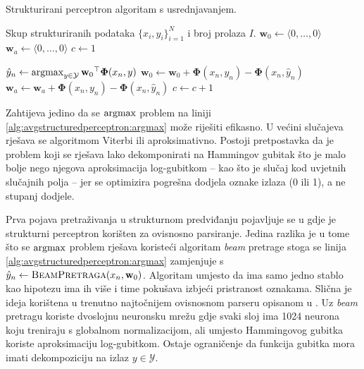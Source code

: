 \begin{algorithm}
\caption{Strukturirani perceptron algoritam s usrednjavanjem.}
\label{alg:avgstructuredperceptron}
\begin{algorithmic}[1]
\Require Skup strukturiranih podataka $\{x_i, y_i\}_{i=1}^N$ i broj prolaza $I$.
\State $\mathbf{w}_0 \gets \langle 0, \ldots, 0 \rangle$
\State $\mathbf{w}_a \gets \langle 0, \ldots, 0 \rangle$
\State $c \gets 1$

    \State $\hat{y}_n \gets \operatorname*{argmax}_{y \in \mathcal{Y}} {\mathbf{w}_0}^\top \mathbf{\Phi}(x_n, y)$ \label{alg:avgstructuredperceptron:argmax}
    \label{alg:structuredperceptron:condition}
    \State $\mathbf{w}_0 \gets \mathbf{w}_0 + \mathbf{\Phi}(x_n, y_n) - \mathbf{\Phi}(x_n, \hat{y}_n)$
    \State $\mathbf{w}_a \gets \mathbf{w}_a + \mathbf{\Phi}(x_n, y_n) - \mathbf{\Phi}(x_n, \hat{y}_n)$
    \EndIf
    \State $c \gets c + 1$
  \EndFor

\EndFor

\State {}
\end{algorithmic}
\end{algorithm}

Zahtijeva jedino da se $\operatorname*{argmax}$ problem na liniji
\ref{alg:avgstructuredperceptron:argmax} može riješiti efikasno. U većini
slučajeva rješava se algoritmom Viterbi ili aproksimativno. Postoji pretpostavka
da je problem koji se rješava lako dekomponirati na Hammingov gubitak što je
malo bolje nego njegova aproksimacija log-gubitkom -- kao što je slučaj kod
uvjetnih slučajnih polja -- jer se optimizira pogrešna dodjela oznake izlaza (0
ili 1), a ne stupanj dodjele.

Prva pojava pretraživanja u strukturnom predviđanju pojavljuje se u
\citep{collins2004incremental} gdje je strukturni perceptron korišten za
ovisnosno parsiranje. Jedina razlika je u tome što se $\operatorname*{argmax}$ problem rješava
koristeći algoritam \textit{beam} pretrage stoga se linija
\ref{alg:avgstructuredperceptron:argmax} zamjenjuje s $\hat{y}_n \gets
\textsc{BeamPretraga}(x_n, \mathbf{w}_0)$. Algoritam umjesto da ima samo jedno
stablo kao hipotezu ima ih više i time pokušava izbjeći pristranost oznakama.
Slična je ideja korištena u trenutno najtočnijem ovisnosnom parseru opisanom u
\citep{andor2016globally}. Uz \textit{beam} pretragu koriste dvoslojnu neuronsku
mrežu gdje svaki sloj ima 1024 neurona koju treniraju s globalnom
normalizacijom, ali umjesto Hammingovog gubitka koriste aproksimaciju
log-gubitkom. Ostaje ograničenje da funkcija gubitka mora imati dekompoziciju na
izlaz $y \in \mathcal{Y}$.
